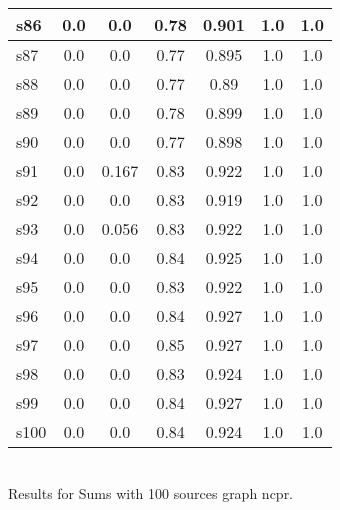 \documentclass{article}
\begin{document}
\begin{tabular}{|l|c|c|c|c|c|c|}
\hline
s86 &0.0 & 0.0 & 0.78 & 0.901 & 1.0 & 1.0\\
\hline
s87 &0.0 & 0.0 & 0.77 & 0.895 & 1.0 & 1.0\\
\hline
s88 &0.0 & 0.0 & 0.77 & 0.89 & 1.0 & 1.0\\
\hline
s89 &0.0 & 0.0 & 0.78 & 0.899 & 1.0 & 1.0\\
\hline
s90 &0.0 & 0.0 & 0.77 & 0.898 & 1.0 & 1.0\\
\hline
s91 &0.0 & 0.167 & 0.83 & 0.922 & 1.0 & 1.0\\
\hline
s92 &0.0 & 0.0 & 0.83 & 0.919 & 1.0 & 1.0\\
\hline
s93 &0.0 & 0.056 & 0.83 & 0.922 & 1.0 & 1.0\\
\hline
s94 &0.0 & 0.0 & 0.84 & 0.925 & 1.0 & 1.0\\
\hline
s95 &0.0 & 0.0 & 0.83 & 0.922 & 1.0 & 1.0\\
\hline
s96 &0.0 & 0.0 & 0.84 & 0.927 & 1.0 & 1.0\\
\hline
s97 &0.0 & 0.0 & 0.85 & 0.927 & 1.0 & 1.0\\
\hline
s98 &0.0 & 0.0 & 0.83 & 0.924 & 1.0 & 1.0\\
\hline
s99 &0.0 & 0.0 & 0.84 & 0.927 & 1.0 & 1.0\\
\hline
s100 &0.0 & 0.0 & 0.84 & 0.924 & 1.0 & 1.0\\
\hline
\end{tabular}\\

\noindent Results for Sums with 100 sources graph ncpr.
\end{document}
